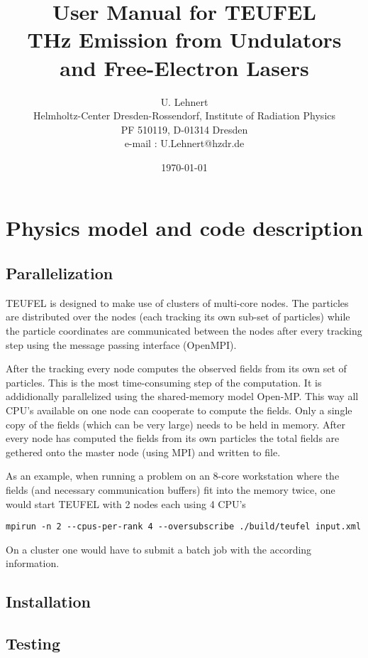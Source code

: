 \documentclass[11pt]{article}
\title{User Manual for TEUFEL \\ THz Emission from Undulators and Free-Electron Lasers}
\author{U. Lehnert\\
\footnotesize{Helmholtz-Center Dresden-Rossendorf, Institute of Radiation Physics}\\
\footnotesize{PF 510119, D-01314 Dresden}\\
\footnotesize{e-mail : U.Lehnert@hzdr.de}}
\date{\today\\[1cm]}
\begin{document}
\maketitle
\tableofcontents

\section{Physics model and code description}

\subsection{Parallelization}

TEUFEL is designed to make use of clusters of multi-core nodes.
The particles are distributed over the nodes (each tracking its own sub-set of particles)
while the particle coordinates are communicated between the nodes
after every tracking step using the message passing interface (OpenMPI).

After the tracking every node computes the observed fields from its own set of particles.
This is the most time-consuming step of the computation. It is addidionally parallelized
using the shared-memory model Open-MP. This way all CPU's available on one node
can cooperate to compute the fields. Only a single copy of the fields (which can be very large)
needs to be held in memory. After every node has computed the fields from its own particles
the total fields are gethered onto the master node (using MPI) and written to file.

As an example, when running a problem on an 8-core workstation where the fields
(and necessary communication buffers) fit into the memory twice,
one would start TEUFEL with 2 nodes each using 4 CPU's
\begin{lstlisting}
mpirun -n 2 --cpus-per-rank 4 --oversubscribe ./build/teufel input.xml
\end{lstlisting}

On a cluster one would have to submit a batch job with the according information.

\subsection{Installation}

\subsection{Testing}
\end{document}
